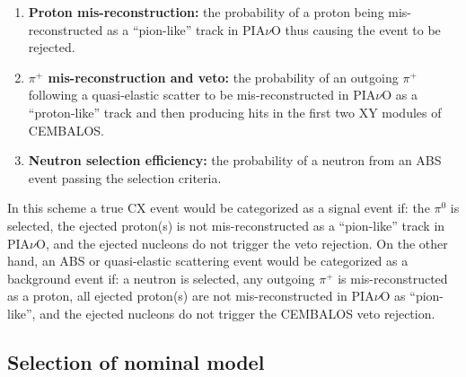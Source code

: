 \begin{enumerate}
\item{{\bf Proton mis-reconstruction:} the probability of a proton being mis-reconstructed as a ``pion-like'' track in PIA$\nu$O thus causing the event to be rejected.}

\item{{\bf $\pi^{+}$ mis-reconstruction and veto:} the probability of an outgoing $\pi^{+}$ following a quasi-elastic scatter to be mis-reconstructed in PIA$\nu$O as a ``proton-like'' track and then producing hits in the first two XY modules of CEMBALOS.}

\item{{\bf Neutron selection efficiency:} the probability of a neutron from an ABS event passing the selection criteria.}
\end{enumerate}

In this scheme a true CX event would be categorized as a signal event if: the $\pi^{0}$ is selected, the ejected proton(s) is not mis-reconstructed as a ``pion-like'' track in PIA$\nu$O, and the ejected nucleons do not trigger the veto rejection. On the other hand, an ABS or quasi-elastic scattering event would be categorized as a background event if: a neutron is selected, any outgoing $\pi^{+}$ is mis-reconstructed as a proton, all ejected proton(s) are not mis-reconstructed in PIA$\nu$O as ``pion-like'', and the ejected nucleons do not trigger the CEMBALOS veto rejection. 

\subsection{Selection of nominal model}\label{sec:nominal}

